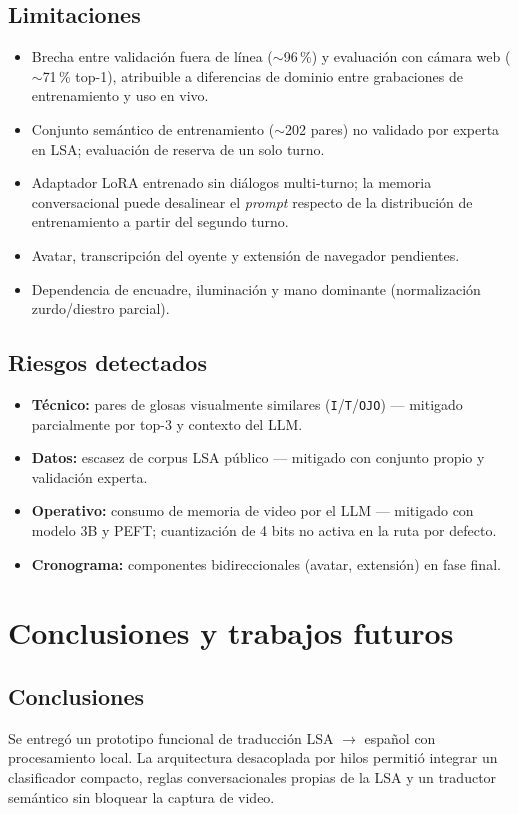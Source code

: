 \documentclass[12pt,a4paper]{report}
\begin{document}
\section{Limitaciones}
\begin{itemize}
    \item Brecha entre validación fuera de línea ($\sim$96\,\%) y evaluación con cámara web ($\sim$71\,\% top-1), atribuible a diferencias de dominio entre grabaciones de entrenamiento y uso en vivo.
    \item Conjunto semántico de entrenamiento ($\sim$202 pares) no validado por experta en LSA; evaluación de reserva de un solo turno.
    \item Adaptador LoRA entrenado sin diálogos multi-turno; la memoria conversacional puede desalinear el \textit{prompt} respecto de la distribución de entrenamiento a partir del segundo turno.
    \item Avatar, transcripción del oyente y extensión de navegador pendientes.
    \item Dependencia de encuadre, iluminación y mano dominante (normalización zurdo/diestro parcial).
\end{itemize}

\section{Riesgos detectados}
\begin{itemize}
    \item \textbf{Técnico:} pares de glosas visualmente similares (\texttt{I}/\texttt{T}/\texttt{OJO}) --- mitigado parcialmente por top-3 y contexto del LLM.
    \item \textbf{Datos:} escasez de corpus LSA público --- mitigado con conjunto propio y validación experta.
    \item \textbf{Operativo:} consumo de memoria de video por el LLM --- mitigado con modelo 3B y PEFT; cuantización de 4 bits no activa en la ruta por defecto.
    \item \textbf{Cronograma:} componentes bidireccionales (avatar, extensión) en fase final.
\end{itemize}

\chapter{Conclusiones y trabajos futuros}
\section{Conclusiones}
Se entregó un prototipo funcional de traducción LSA $\rightarrow$ español con procesamiento local. La arquitectura desacoplada por hilos permitió integrar un clasificador compacto, reglas conversacionales propias de la LSA y un traductor semántico sin bloquear la captura de video.
\end{document}
